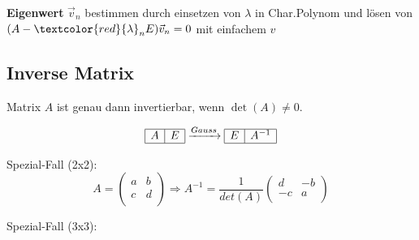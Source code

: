 \noindent \textbf{Eigenwert} $\vec{v}_n$ bestimmen durch einsetzen von $\lambda$ in Char.Polynom und lösen von $(A - \textcolor{red}{\lambda}_n E)\vec{v}_n = 0$ mit einfachem $v$ 


\subsection{Inverse Matrix}\label{inversematrix}
Matrix $A$ ist genau dann invertierbar, wenn $\det(A) \neq 0$. 

\[
\begin{array}{|c|c|} \hline A & E \\ \hline \end{array} \xrightarrow{Gauss}
\begin{array}{|c|c|} \hline E & A^{-1} \\ \hline \end{array} 
\]

\noindent
Spezial-Fall (2x2):
\[
A = \begin{pmatrix}
	a & b \\
	c & d \\
\end{pmatrix}
\Rightarrow 
A^{-1} =\frac{1}{det(A)}
\begin{pmatrix}
	d & -b \\
	-c & a \\
\end{pmatrix}
\]

\noindent
Spezial-Fall (3x3):


